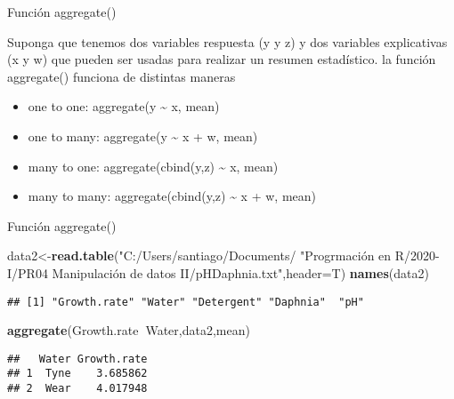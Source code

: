 \documentclass[ignorenonframetext,]{beamer}
\newenvironment{Shaded}{\begin{snugshade}}{\end{snugshade}}
\newcommand{\KeywordTok}[1]{\textcolor[rgb]{0.13,0.29,0.53}{\textbf{#1}}}
\newcommand{\DataTypeTok}[1]{\textcolor[rgb]{0.13,0.29,0.53}{#1}}
\newcommand{\StringTok}[1]{\textcolor[rgb]{0.31,0.60,0.02}{#1}}
\newcommand{\OperatorTok}[1]{\textcolor[rgb]{0.81,0.36,0.00}{\textbf{#1}}}
\newcommand{\NormalTok}[1]{#1}
\providecommand{\tightlist}{%
  \setlength{\itemsep}{0pt}\setlength{\parskip}{0pt}}
\begin{document}
\begin{frame}{Función aggregate()}

Suponga que tenemos dos variables respuesta (y y z) y dos variables
explicativas (x y w) que pueden ser usadas para realizar un resumen
estadístico. la función aggregate() funciona de distintas maneras

\begin{itemize}
\tightlist
\item
  one to one: aggregate(y \textasciitilde{} x, mean)
\item
  one to many: aggregate(y \textasciitilde{} x + w, mean)
\item
  many to one: aggregate(cbind(y,z) \textasciitilde{} x, mean)
\item
  many to many: aggregate(cbind(y,z) \textasciitilde{} x + w, mean)
\end{itemize}

\end{frame}

\begin{frame}[fragile]{Función aggregate()}

\begin{Shaded}
\begin{Highlighting}[]
\NormalTok{data2<-}\KeywordTok{read.table}\NormalTok{(}\StringTok{"C:/Users/santiago/Documents/}
	\StringTok{"Progrmación en R/2020-I/PR04}
	\StringTok{Manipulación de datos II/pHDaphnia.txt"}\NormalTok{,}\DataTypeTok{header=}\NormalTok{T)}
\KeywordTok{names}\NormalTok{(data2)}
\end{Highlighting}
\end{Shaded}

\begin{verbatim}
## [1] "Growth.rate" "Water" "Detergent" "Daphnia"  "pH"
\end{verbatim}

\begin{Shaded}
\begin{Highlighting}[]
\KeywordTok{aggregate}\NormalTok{(Growth.rate}\OperatorTok{~}\NormalTok{Water,data2,mean)}
\end{Highlighting}
\end{Shaded}

\begin{verbatim}
##   Water Growth.rate
## 1  Tyne    3.685862
## 2  Wear    4.017948
\end{verbatim}

\end{frame}
\end{document}
